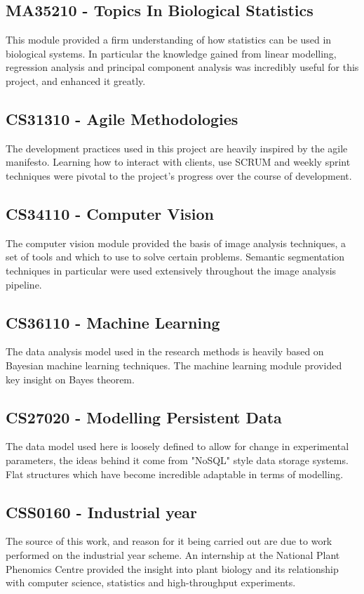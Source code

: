 \documentclass[11pt]{report}
\begin{document}
\subsection{MA35210 - Topics In Biological Statistics}
\label{sec:org857acff}
This module provided a firm understanding of how statistics can be used in biological systems. In particular the knowledge gained from linear modelling, regression analysis and principal component analysis was incredibly useful for this project, and enhanced it greatly.
\subsection{CS31310 - Agile Methodologies}
\label{sec:orgafaaa0d}
The development practices used in this project are heavily inspired by the agile manifesto. Learning how to interact with clients, use SCRUM and weekly sprint techniques were pivotal to the project's progress over the course of development.
\subsection{CS34110 - Computer Vision}
\label{sec:org7ff6ecc}
The computer vision module provided the basis of image analysis techniques, a set of tools and which to use to solve certain problems. Semantic segmentation techniques in particular were used extensively throughout the image analysis pipeline.
\subsection{CS36110 - Machine Learning}
\label{sec:org573fd20}
The data analysis model used in the research methods is heavily based on Bayesian machine learning techniques. The machine learning module provided key insight on Bayes theorem.
\subsection{CS27020 - Modelling Persistent Data}
\label{sec:org688ad94}
The data model used here is loosely defined to allow for change in experimental parameters, the ideas behind it come from "NoSQL" style data storage systems. Flat structures which have become incredible adaptable in terms of modelling.
\subsection{CSS0160 - Industrial year}
\label{sec:orgffc2c10}
The source of this work, and reason for it being carried out are due to work performed on the industrial year scheme. An internship at the National Plant Phenomics Centre provided the insight into plant biology and its relationship with computer science, statistics and high-throughput experiments.
\end{document}
